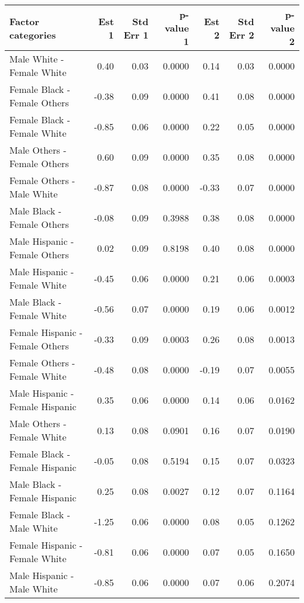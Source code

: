 \begin{table}[H]
\footnotesize
\centering
\begin{tabular}{lrrrrrr}
  \hline
  Factor categories & Est 1 & Std Err 1 & p-value 1 & Est 2 & Std Err 2 & p-value 2 \\ 
  \hline
    Male White -  Female White & 0.40 & 0.03 & 0.0000 & 0.14 & 0.03 & 0.0000 \\ 
    Female Black -  Female Others & -0.38 & 0.09 & 0.0000 & 0.41 & 0.08 & 0.0000 \\ 
    Female Black -  Female White & -0.85 & 0.06 & 0.0000 & 0.22 & 0.05 & 0.0000 \\ 
    Male Others -  Female Others & 0.60 & 0.09 & 0.0000 & 0.35 & 0.08 & 0.0000 \\ 
    Female Others -  Male White & -0.87 & 0.08 & 0.0000 & -0.33 & 0.07 & 0.0000 \\ 
    Male Black -  Female Others & -0.08 & 0.09 & 0.3988 & 0.38 & 0.08 & 0.0000 \\ 
    Male Hispanic -  Female Others & 0.02 & 0.09 & 0.8198 & 0.40 & 0.08 & 0.0000 \\ 
    Male Hispanic -  Female White & -0.45 & 0.06 & 0.0000 & 0.21 & 0.06 & 0.0003 \\ 
    Male Black -  Female White & -0.56 & 0.07 & 0.0000 & 0.19 & 0.06 & 0.0012 \\ 
    Female Hispanic -  Female Others & -0.33 & 0.09 & 0.0003 & 0.26 & 0.08 & 0.0013 \\ 
    Female Others -  Female White & -0.48 & 0.08 & 0.0000 & -0.19 & 0.07 & 0.0055 \\ 
    Male Hispanic -  Female Hispanic & 0.35 & 0.06 & 0.0000 & 0.14 & 0.06 & 0.0162 \\ 
    Male Others -  Female White & 0.13 & 0.08 & 0.0901 & 0.16 & 0.07 & 0.0190 \\ 
    Female Black -  Female Hispanic & -0.05 & 0.08 & 0.5194 & 0.15 & 0.07 & 0.0323 \\ 
    Male Black -  Female Hispanic & 0.25 & 0.08 & 0.0027 & 0.12 & 0.07 & 0.1164 \\ 
    Female Black -  Male White & -1.25 & 0.06 & 0.0000 & 0.08 & 0.05 & 0.1262 \\ 
    Female Hispanic -  Female White & -0.81 & 0.06 & 0.0000 & 0.07 & 0.05 & 0.1650 \\ 
    Male Hispanic -  Male White & -0.85 & 0.06 & 0.0000 & 0.07 & 0.06 & 0.2074 \\ 

\end{tabular}
\end{table}
